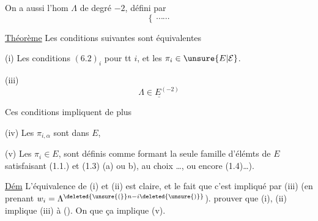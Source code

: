 
On a aussi l'hom $\Lambda$ de degré $-2$, défini par
\[
 \left\{\ \cdots\cdots\ \right. \tag*{(6.5)}
\]

\uline{Théorème} Les conditions suivantes  sont équivalentes

(i) Les conditions  $(6.2)_i$ pour tt $i$, et les $\pi_i\in \unsure{E|\mathcal E}$.

  


(iii)   
\[
 \underline{\Lambda\in E^{(-2)}}\tag*{(6.6)}
\]

 Ces conditions impliquent de plus

(iv) Les $\pi_{i,\alpha}$ sont dans $E$, 

(v) Les $\pi_i\in E$,  sont définis  comme formant  la seule famille d'élémts de $E$ satisfaisant (1.1.) et (1.3) (a) ou b), au choix \ldots,  ou encore (1.4)\ldots).


\uline{Dém} L'équivalence de (i) et (ii) est claire, et le fait que c'est impliqué par (iii) (en prenant $w_i=\Lambda^{\deleted{\unsure{(}}n-i\deleted{\unsure{)}}}$).   prouver que (i), (ii) implique (iii) à (). On   que ça implique  (v).
